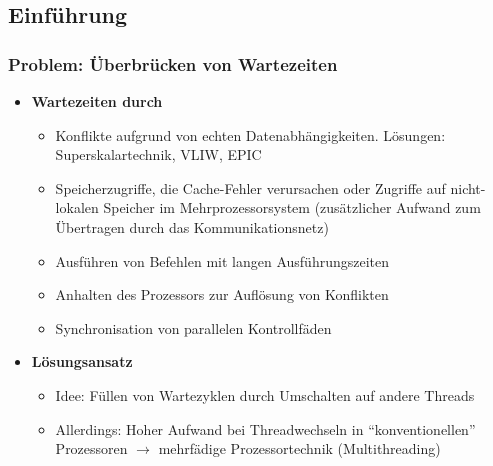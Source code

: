 \subsection{Einführung}

\subsubsection{Problem: Überbrücken von Wartezeiten}
\begin{itemize}
	\item \textbf{Wartezeiten durch}
	\begin{itemize}
		\item Konflikte aufgrund von echten Datenabhängigkeiten. Lösungen: Superskalartechnik, VLIW, EPIC
		\item Speicherzugriffe, die Cache-Fehler verursachen oder Zugriffe auf nicht-lokalen Speicher im Mehrprozessorsystem (zusätzlicher Aufwand zum Übertragen durch das Kommunikationsnetz)
		\item Ausführen von Befehlen mit langen Ausführungszeiten
		\item Anhalten des Prozessors zur Auflösung von Konflikten
		\item Synchronisation von parallelen Kontrollfäden
	\end{itemize}
	\item \textbf{Lösungsansatz}
	\begin{itemize}
		\item Idee: Füllen von Wartezyklen durch Umschalten auf andere Threads
		\item Allerdings: Hoher Aufwand bei Threadwechseln in "`konventionellen"' Prozessoren \(\rightarrow\) mehrfädige Prozessortechnik (Multithreading)
	\end{itemize}
\end{itemize}

